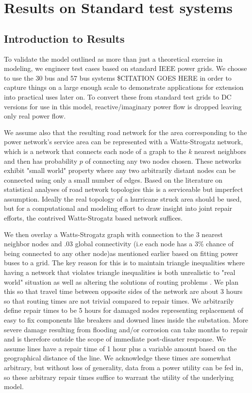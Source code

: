 \documentclass{article}
\begin{document}
	\section{Results on Standard test systems}
	\subsection{Introduction to Results}
	To validate the model outlined as more than just a theoretical exercise in modeling, we engineer test cases based on standard IEEE power grids. We choose to use the 30 bus and 57 bus systems \$CITATION GOES HERE in order to capture things on a large enough scale to demonstrate applications for extension into practical uses later on. To convert these from standard test grids to DC versions for use in this model, reactive/imaginary power flow is dropped leaving only real power flow.
	
		We assume also that the resulting road network for the area corresponding to the power network's service area can be represented with a Watts-Strogatz network, which is a network that connects each node of a graph to the $k$ nearest neighbors and then has probability $p$ of connecting any two nodes chosen. These networks exhibit "small world" property where any two arbitrarily distant nodes can be connected using only a small number of edges. Based on the literature on statistical analyses of road network topologies \cite{LammerEA2006} \cite{ChanEA2011} this is a serviceable but imperfect assumption. Ideally the real topology of a hurricane struck area should be used, but for a computational and modeling effort to draw insight into joint repair efforts, the contrived Watts-Strogatz based network suffices.
		
		 We then overlay a Watts-Strogatz graph with connection to the 3 nearest neighbor nodes and .03 global connectivity (i.e each node has a 3\% chance of being connected to any other node)as mentioned earlier based on fitting power buses to a grid. The key reason for this is to maintain triangle inequalities where having a network that violates triangle inequalities is both unrealistic to "real world" situation as well as altering the solutions of routing problems \cite{FlemingEA2013}. We plan this so that travel time between opposite sides of the network are about 3 hours so that routing times are not trivial compared to repair times. We arbitrarily define repair times to be 5 hours for damaged nodes representing replacement of easy to fix components like breakers and downed lines inside the substation. More severe damage resulting from flooding and/or corrosion can take months to repair and is therefore outside the scope of immediate post-disaster response. We assume lines have a repair time of 1 hour plus a variable amount based on the geographical distance of the line. We acknowledge these times are somewhat arbitrary, but without loss of generality, data from a power utility can be fed in, so these arbitrary repair times suffice to warrant the utility of the underlying model.
	
\end{document}
